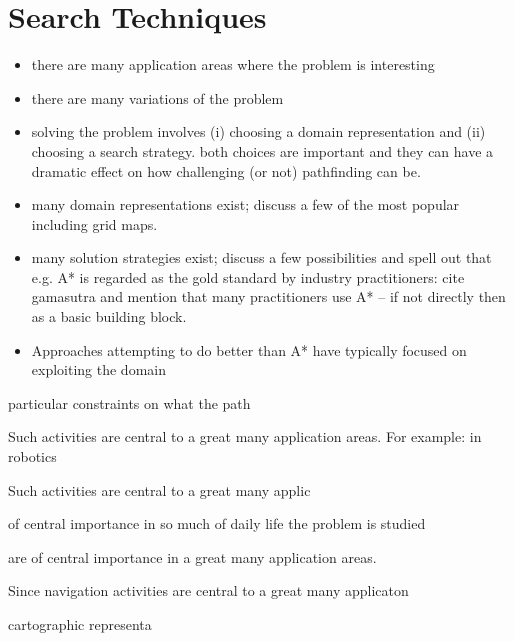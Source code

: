 \section{Search Techniques}
\label{cha::intro::search}


\begin{itemize}
\item there are many application areas where the problem is interesting
\item there are many variations of the problem
\item solving the problem  involves (i) choosing a domain representation
and (ii) choosing a search strategy. both choices are important and they
can have a dramatic effect on how challenging (or not) pathfinding can be.
\item many domain representations exist; discuss a few of the most popular
including grid maps.
\item many solution strategies exist; discuss a few possibilities and
spell out that e.g. A* is regarded as the gold standard by industry
practitioners: cite gamasutra and mention that many practitioners use A*
-- if not directly then as a basic building block.
\item
Approaches attempting to do better than A* have typically focused on 
exploiting the domain 
\end{itemize}


particular constraints on what the path 

Such activities are central
to a great many application areas. For example: in robotics 

Such activities are
central to a great many applic


of central importance in so much of daily life the problem is studied



are of central importance in a great many application areas.

Since navigation
activities are central to a great many applicaton 

cartographic
representa


